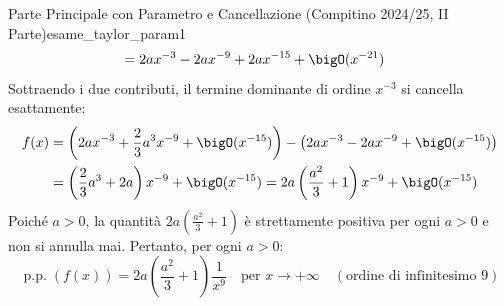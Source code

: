 \begin{esempio}{Parte Principale con Parametro e Cancellazione (Compitino 2024/25, II Parte)}{esame_taylor_param1}
\begin{align*}
    &= 2ax^{-3} - 2ax^{-9} + 2ax^{-15} + \bigO(x^{-21})
\end{align*}
Sottraendo i due contributi, il termine dominante di ordine $x^{-3}$ si cancella esattamente:
\begin{align*}
    f(x) &= \left(2ax^{-3} + \frac{2}{3}a^3 x^{-9} + \bigO(x^{-15})\right) - \left(2ax^{-3} - 2ax^{-9} + \bigO(x^{-15})\right) \\
    &= \left(\frac{2}{3}a^3 + 2a\right)x^{-9} + \bigO(x^{-15}) = 2a\left(\frac{a^2}{3} + 1\right)x^{-9} + \bigO(x^{-15})
\end{align*}
Poiché $a > 0$, la quantità $2a\left(\frac{a^2}{3} + 1\right)$ è strettamente positiva per ogni $a > 0$ e non si annulla mai.
Pertanto, per ogni $a > 0$:
\[
    \operatorname{p.p.}(f(x)) = 2a\left(\frac{a^2}{3} + 1\right)\frac{1}{x^9} \quad \text{per } x \to +\infty \quad (\text{ordine di infinitesimo } 9)
\]


\end{esempio}
